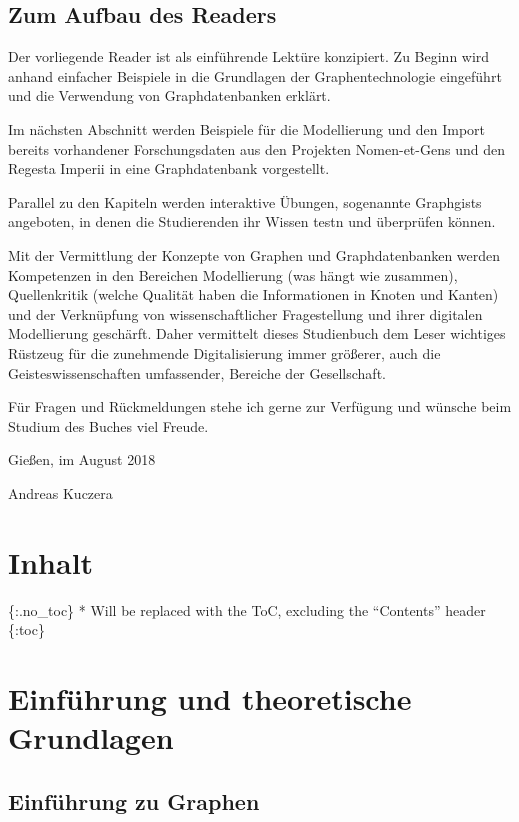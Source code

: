 \documentclass[ngerman,]{scrreprt}
\begin{document}
\hypertarget{zum-aufbau-des-readers}{%
\section{Zum Aufbau des Readers}\label{zum-aufbau-des-readers}}

Der vorliegende Reader ist als einführende Lektüre konzipiert. Zu Beginn wird anhand einfacher Beispiele in die Grundlagen der Graphentechnologie eingeführt und die Verwendung von Graphdatenbanken erklärt.

Im nächsten Abschnitt werden Beispiele für die Modellierung und den Import bereits vorhandener Forschungsdaten aus den Projekten Nomen-et-Gens und den Regesta Imperii in eine Graphdatenbank vorgestellt.

Parallel zu den Kapiteln werden interaktive Übungen, sogenannte Graphgists angeboten, in denen die Studierenden ihr Wissen testn und überprüfen können.

Mit der Vermittlung der Konzepte von Graphen und Graphdatenbanken werden Kompetenzen in den Bereichen Modellierung (was hängt wie zusammen), Quellenkritik (welche Qualität haben die Informationen in Knoten und Kanten) und der Verknüpfung von wissenschaftlicher Fragestellung und ihrer digitalen Modellierung geschärft. Daher vermittelt dieses Studienbuch dem Leser wichtiges Rüstzeug für die zunehmende Digitalisierung immer größerer, auch die Geisteswissenschaften umfassender, Bereiche der Gesellschaft.

Für Fragen und Rückmeldungen stehe ich gerne zur Verfügung und wünsche beim Studium des Buches viel Freude.

Gießen, im August 2018

Andreas Kuczera

\hypertarget{inhalt-1}{%
\chapter{Inhalt}\label{inhalt-1}}

\{:.no\_toc\} * Will be replaced with the ToC, excluding the ``Contents'' header \{:toc\}

\hypertarget{einfuxfchrung-und-theoretische-grundlagen}{%
\chapter{Einführung und theoretische Grundlagen}\label{einfuxfchrung-und-theoretische-grundlagen}}

\hypertarget{einfuxfchrung-zu-graphen}{%
\section{Einführung zu Graphen}\label{einfuxfchrung-zu-graphen}}
\end{document}
